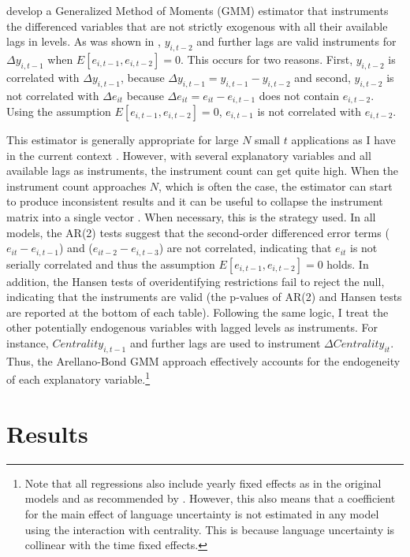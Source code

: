 \citet{arellano1991} develop a Generalized Method of Moments (GMM) estimator that instruments the differenced variables that are not strictly exogenous with all their available lags in levels. As was shown in \citet{arellano2001}, $y_{i,t-2}$ and further lags are valid instruments for $\Delta y_{i,t-1}$ when $E[e_{i,t-1}, e_{i,t-2}] = 0$. This occurs for two reasons. First, $y_{i,t-2}$ is correlated with $\Delta y_{i,t-1}$, because $\Delta y_{i,t-1} = y_{i,t-1}-y_{i,t-2}$ and second, $y_{i,t-2}$ is not correlated with $\Delta e_{it}$ because $\Delta e_{it} = e_{it}-e_{i,t-1}$ does not contain $e_{i,t-2}$. Using the assumption $E[e_{i,t-1}, e_{i,t-2}] = 0$, $e_{i,t-1}$ is not correlated with $e_{i,t-2}$. 

This estimator is generally appropriate for large $N$ small $t$ applications as I have in the current context \citep{arellano1995}. However, with several explanatory variables and all available lags as instruments, the instrument count can get quite high. When the instrument count approaches $N$, which is often the case, the estimator can start to produce inconsistent results and it can be useful to collapse the instrument matrix into a single vector \citep{roodman2006}. When necessary, this is the strategy used. In all models, the AR(2) tests \citep{arellano1991} suggest that the second-order differenced error terms ($e_{it}-e_{i,t-1}$) and ($e_{it-2}-e_{i,t-3}$) are not correlated, indicating that $e_{it}$ is not serially correlated and thus the assumption $E[e_{i,t-1}, e_{i,t-2}] = 0$ holds. In addition, the Hansen tests of overidentifying restrictions fail to reject the null, indicating that the instruments are valid (the p-values of AR(2) and Hansen tests are reported at the bottom of each table). Following the same logic, I treat the other potentially endogenous variables with lagged levels as instruments. For instance, $Centrality_{i,t-1}$ and further lags are used to instrument $\Delta Centrality_{it}$. Thus, the Arellano-Bond GMM approach effectively accounts for the endogeneity of each explanatory variable.\footnote{Note that all regressions also include yearly fixed effects as in the original models and as recommended by \citet{roodman2006}. However, this also means that a coefficient for the main effect of language uncertainty is not estimated in any model using the interaction with centrality. This is because language uncertainty is collinear with the time fixed effects.}

\section{Results}

